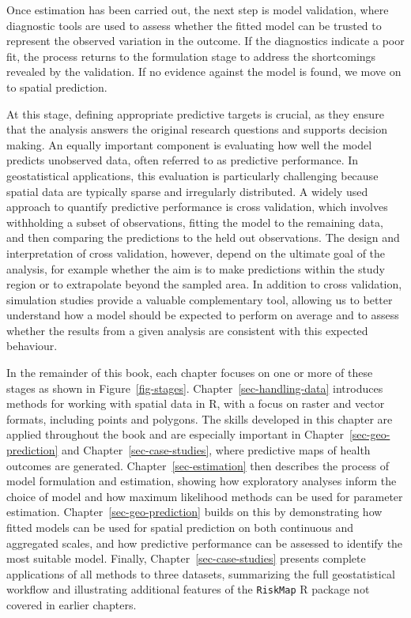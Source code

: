 \documentclass[
  letterpaper,
]{krantz}
\begin{document}
Once estimation has been carried out, the next step is model validation,
where diagnostic tools are used to assess whether the fitted model can
be trusted to represent the observed variation in the outcome. If the
diagnostics indicate a poor fit, the process returns to the formulation
stage to address the shortcomings revealed by the validation. If no
evidence against the model is found, we move on to spatial prediction.

At this stage, defining appropriate predictive targets is crucial, as
they ensure that the analysis answers the original research questions
and supports decision making. An equally important component is
evaluating how well the model predicts unobserved data, often referred
to as predictive performance. In geostatistical applications, this
evaluation is particularly challenging because spatial data are
typically sparse and irregularly distributed. A widely used approach to
quantify predictive performance is cross validation, which involves
withholding a subset of observations, fitting the model to the remaining
data, and then comparing the predictions to the held out observations.
The design and interpretation of cross validation, however, depend on
the ultimate goal of the analysis, for example whether the aim is to
make predictions within the study region or to extrapolate beyond the
sampled area. In addition to cross validation, simulation studies
provide a valuable complementary tool, allowing us to better understand
how a model should be expected to perform on average and to assess
whether the results from a given analysis are consistent with this
expected behaviour.

In the remainder of this book, each chapter focuses on one or more of
these stages as shown in Figure~\ref{fig-stages}.
Chapter~\ref{sec-handling-data} introduces methods for working with
spatial data in R, with a focus on raster and vector formats, including
points and polygons. The skills developed in this chapter are applied
throughout the book and are especially important in
Chapter~\ref{sec-geo-prediction} and Chapter~\ref{sec-case-studies},
where predictive maps of health outcomes are generated.
Chapter~\ref{sec-estimation} then describes the process of model
formulation and estimation, showing how exploratory analyses inform the
choice of model and how maximum likelihood methods can be used for
parameter estimation. Chapter~\ref{sec-geo-prediction} builds on this by
demonstrating how fitted models can be used for spatial prediction on
both continuous and aggregated scales, and how predictive performance
can be assessed to identify the most suitable model. Finally,
Chapter~\ref{sec-case-studies} presents complete applications of all
methods to three datasets, summarizing the full geostatistical workflow
and illustrating additional features of the \texttt{RiskMap} R package
not covered in earlier chapters.
\end{document}
